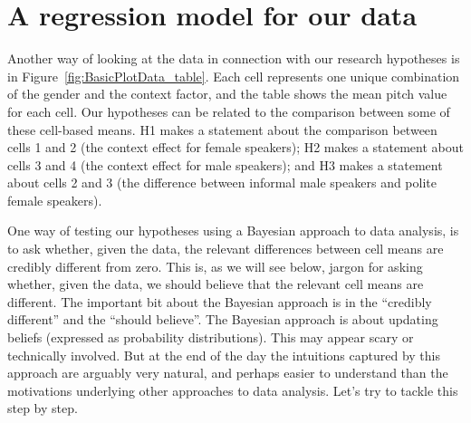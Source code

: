 \documentclass[nobib]{tufte-handout}
\begin{document}
\section{A regression model for our data}

Another way of looking at the data in connection with our research hypotheses is in Figure~\ref{fig:BasicPlotData_table}. Each cell represents one unique combination of the gender and the context factor, and the table shows the mean pitch value for each cell.
Our hypotheses can be related to the comparison between some of these cell-based means.
H1 makes a statement about the comparison between cells 1 and 2 (the context effect for female speakers); H2 makes a statement about cells 3 and 4 (the context effect for male speakers); and H3 makes a statement about cells 2 and 3 (the difference between informal male speakers and polite female speakers).

One way of testing our hypotheses using a Bayesian approach to data analysis, is to ask whether, given the data, the relevant differences between cell means are credibly different from zero. This is, as we will see below, jargon for asking whether, given the data, we should believe that the relevant cell means are different. The important bit about the Bayesian approach is in the ``credibly different'' and the ``should believe''. The Bayesian approach is about updating beliefs (expressed as probability distributions). This may appear scary or technically involved. But at the end of the day the intuitions captured by this approach are arguably very natural, and perhaps easier to understand than the motivations underlying other approaches to data analysis. Let's try to tackle this step by step.
\end{document}

